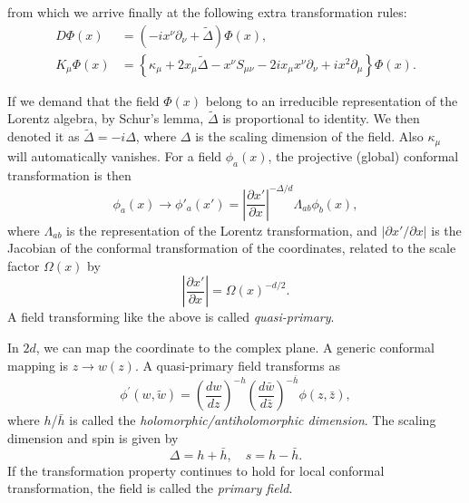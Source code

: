 \documentclass[aps,prb,superscriptaddress,nofootinbib]{revtex4}
\begin{document}
from which we arrive finally at the following extra transformation rules:
\begin{equation}
\begin{aligned}
	D \Phi(x) &=\left(-i x^{\nu} \partial_{\nu}+\tilde{\Delta}\right) \Phi(x), \\
	K_{\mu} \Phi(x) &=\left\{\kappa_{\mu}+2 x_{\mu} \tilde{\Delta}-x^{\nu} S_{\mu \nu}-2 i x_{\mu} x^{\nu} \partial_{\nu}+i x^{2} \partial_{\mu}\right\} \Phi(x).
\end{aligned}
\end{equation}

If we demand that the field $\Phi(x)$ belong to an irreducible representation of the Lorentz algebra, by Schur's lemma, $\tilde \Delta$ is proportional to identity.
We then denoted it as $\tilde \Delta = -i\Delta$, where $\Delta$ is the scaling dimension of the field.
Also $\kappa_\mu$ will automatically vanishes.
For a field $\phi_a(x)$, the projective (global) conformal transformation is then
\begin{equation}
	\phi_a(x) \rightarrow \phi'_a(x') = \left|\frac{\partial x'}{\partial x}\right|^{-\Delta/d} \Lambda_{ab} \phi_b(x),
\end{equation}
where $\Lambda_{ab}$ is the representation of the Lorentz transformation, and $|\partial x'/\partial x|$ is the Jacobian of the conformal transformation of the coordinates, related to the scale factor $\Omega(x)$ by
\begin{equation}
	\left|\frac{\partial x'}{\partial x}\right| = \Omega(x)^{-d/2}.
\end{equation}
A field transforming like the above is called \textit{quasi-primary}.

In $2d$, we can map the coordinate to the complex plane.
A generic conformal mapping is $z \rightarrow w(z)$.
A quasi-primary field transforms as
\begin{equation}
	\phi^{\prime}(w, \tilde{w})=\left(\frac{d w}{d z}\right)^{-h}\left(\frac{d \bar{w}}{d \bar{z}}\right)^{-\bar{h}} \phi(z, \bar{z}),
\end{equation}
where $h$/$\bar h$ is called the \textit{holomorphic/antiholomorphic dimension}.
The scaling dimension and spin is given by
\begin{equation}
	\Delta = h + \bar h, \quad
	s = h - \bar h.
\end{equation}
If the transformation property continues to hold for local conformal transformation, the field is called the \textit{primary field}.
\end{document}
